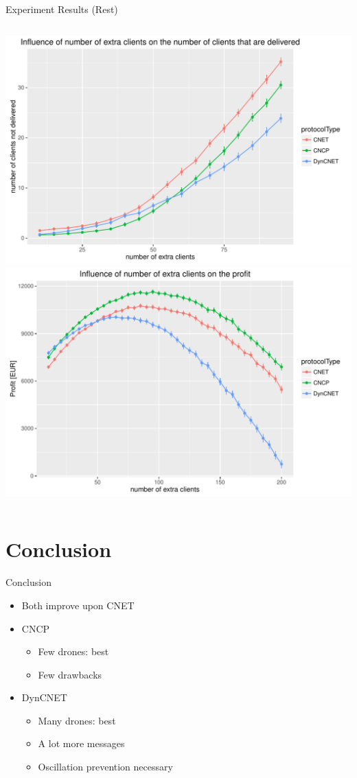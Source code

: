 \documentclass[notes]{beamer}
\begin{document}
\begin{frame}{Experiment Results (Rest)}
\begin{columns}
			\begin{center}	
				\includegraphics[height=0.4\textheight]{dynamicclients-delivered-grid2}\\
				\includegraphics[height=0.4\textheight]{dynamicclients-profit-grid2}
			\end{center}
		\end{columns}
	\end{frame}
	
	\section{Conclusion}
	\begin{frame}{Conclusion}
		\begin{itemize}
			\item Both improve upon CNET
			\item CNCP
				\begin{itemize}
				\item Few drones: best
				\item Few drawbacks
				\end{itemize}
			\item DynCNET
				\begin{itemize}
				\item Many drones: best
				\item A lot more messages
				\item Oscillation prevention necessary
				\end{itemize}
		\end{itemize}
	\end{frame}
	
\end{document}
